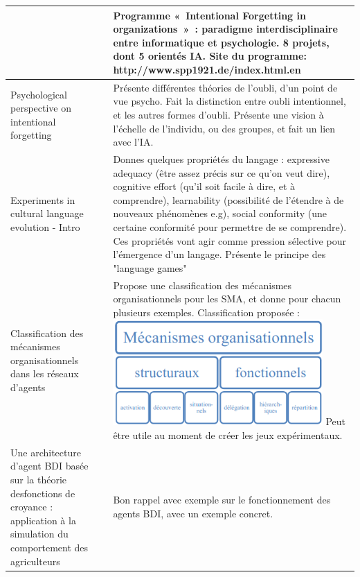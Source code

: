 \documentclass[french]{report}
\begin{document}
\begin{table}[h]
\begin{center}
\begin{tabular}{|p{}|p{}|p{}|}
            & 
            & Programme « Intentional Forgetting in organizations » : paradigme interdisciplinaire entre informatique et psychologie. 8 projets, dont 5 orientés IA.
            Site du programme: http://www.spp1921.de/index.html.en \\
            \hline
            Psychological perspective on intentional forgetting \cite{ellwart_psychological_2019}
            & 
            & Présente différentes théories de l’oubli, d’un point de vue psycho. Fait la distinction entre oubli intentionnel, et les autres formes d’oubli. Présente une vision à l’échelle de l’individu, ou des groupes, et fait un lien avec l’IA. \\
            \hline
            Experiments in cultural language evolution - Intro
            &
            & Donnes quelques propriétés du langage : expressive adequacy (être assez précis sur ce qu'on veut dire), cognitive effort (qu'il soit facile à dire, et à comprendre), learnability (possibilité de l'étendre à de nouveaux phénomènes e.g), social conformity (une certaine conformité pour permettre de se comprendre). Ces propriétés vont agir comme pression sélective pour l'émergence d'un langage. Présente le principe des "language games" \\
            \hline
            Classification des mécanismes organisationnels dans les réseaux d’agents
            & 
            & Propose une classification des mécanismes organisationnels pour les SMA, et donne pour chacun plusieurs exemples. Classification proposée :
            \includegraphics[width=8cm]{images/meca_orga.png}
            Peut être utile au moment de créer les jeux expérimentaux.
            \\
            \hline
            Une architecture d’agent BDI basée sur la théorie desfonctions de croyance : application à la simulation du comportement des agriculteurs
            &
            & Bon rappel avec exemple sur le fonctionnement des agents BDI, avec un exemple concret. \\
            \hline
        \end{tabular}
    \end{center}
    \end{table}
\end{document}
